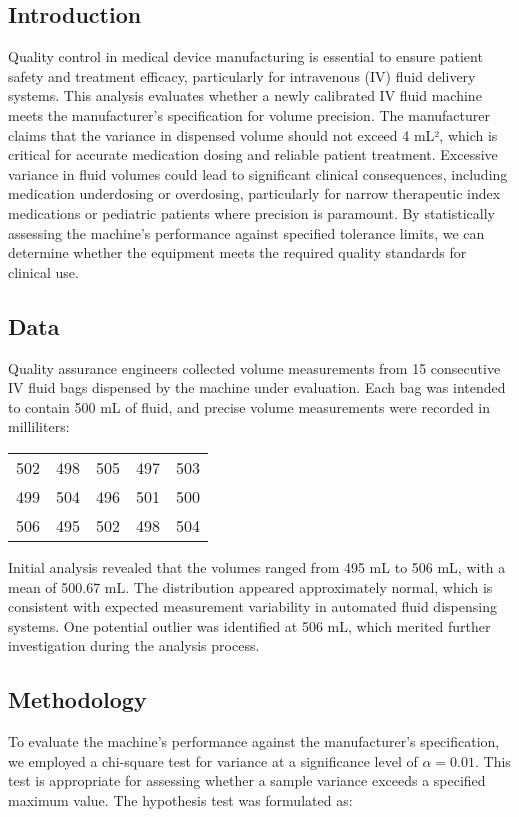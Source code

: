 \documentclass[12pt]{article}
\begin{document}
\subsection{Introduction}
Quality control in medical device manufacturing is essential to ensure patient safety and treatment efficacy, particularly for intravenous (IV) fluid delivery systems. This analysis evaluates whether a newly calibrated IV fluid machine meets the manufacturer's specification for volume precision. The manufacturer claims that the variance in dispensed volume should not exceed 4 mL², which is critical for accurate medication dosing and reliable patient treatment. Excessive variance in fluid volumes could lead to significant clinical consequences, including medication underdosing or overdosing, particularly for narrow therapeutic index medications or pediatric patients where precision is paramount. By statistically assessing the machine's performance against specified tolerance limits, we can determine whether the equipment meets the required quality standards for clinical use.

\subsection{Data}
Quality assurance engineers collected volume measurements from 15 consecutive IV fluid bags dispensed by the machine under evaluation. Each bag was intended to contain 500 mL of fluid, and precise volume measurements were recorded in milliliters:

\begin{center}
\begin{tabular}{ccccc}
502 & 498 & 505 & 497 & 503 \\
499 & 504 & 496 & 501 & 500 \\
506 & 495 & 502 & 498 & 504 \\
\end{tabular}
\end{center}

\noindent Initial analysis revealed that the volumes ranged from 495 mL to 506 mL, with a mean of 500.67 mL. The distribution appeared approximately normal, which is consistent with expected measurement variability in automated fluid dispensing systems. One potential outlier was identified at 506 mL, which merited further investigation during the analysis process.

\subsection{Methodology}
To evaluate the machine's performance against the manufacturer's specification, we employed a chi-square test for variance at a significance level of $\alpha = 0.01$. This test is appropriate for assessing whether a sample variance exceeds a specified maximum value. The hypothesis test was formulated as:
\end{document}

